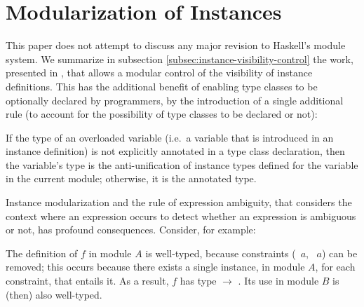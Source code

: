 \section{Modularization of Instances}
\label{sec:modular-instances}

This paper does not attempt to discuss any major revision to Haskell's
module system. We summarize in subsection
\ref{subsec:instance-visibility-control} the work, presented in
\cite{Controlling-scope-instances}, that allows a modular control of
the visibility of instance definitions. This has the additional
benefit of enabling type classes to be optionally declared by
programmers, by the introduction of a single additional rule (to
account for the possibility of type classes to be declared or not):

\begin{definition}

If the type of an overloaded variable (i.e.~a variable that is
introduced in an instance definition) is not explicitly annotated in a
type class declaration, then the variable's type is the
anti-unification of instance types defined for the variable in the
current module; otherwise, it is the annotated type.

\label{overloaded-variable-type}
\end{definition}

Instance modularization and the rule of expression ambiguity, that
considers the context where an expression occurs to detect whether an
expression is ambiguous or not, has profound consequences. Consider,
for example:


The definition of $f$ in module $A$ is well-typed, because constraints
(\SShow\ $a$, \RRead\ $a$) can be removed; this occurs because there
exists a single instance, in module $A$, for each constraint, that
entails it. As a result, $f$ has type \String $\rightarrow$
\String. Its use in module $B$ is (then) also well-typed.

